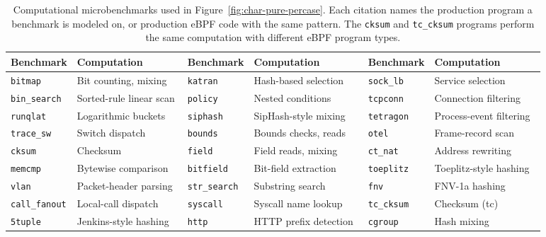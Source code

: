 \begin{table}[t]
\centering
\small
\caption{Computational microbenchmarks used in Figure~\ref{fig:char-pure-percase}. Each citation names the production program a benchmark is modeled on, or production eBPF code with the same pattern. The \texttt{cksum} and \texttt{tc\_cksum} programs perform the same computation with different eBPF program types.}
\label{tab:microbenchmarks}
\renewcommand{\arraystretch}{1.08}
\begin{tabular*}{\textwidth}{@{\extracolsep{\fill}}ll@{\hspace{1em}}ll@{\hspace{1em}}ll@{}}
\toprule
\textbf{Benchmark} & \textbf{Computation} & \textbf{Benchmark} & \textbf{Computation} & \textbf{Benchmark} & \textbf{Computation} \\
\midrule
\texttt{bitmap} & Bit counting, mixing & \texttt{katran} & Hash-based selection~\cite{katran} & \texttt{sock\_lb} & Service selection~\cite{cilium} \\
\texttt{bin\_search} & Sorted-rule linear scan & \texttt{policy} & Nested conditions~\cite{cilium} & \texttt{tcpconn} & Connection filtering~\cite{bcc} \\
\texttt{runqlat} & Logarithmic buckets~\cite{bcc} & \texttt{siphash} & SipHash-style mixing & \texttt{tetragon} & Process-event filtering~\cite{tetragon} \\
\texttt{trace\_sw} & Switch dispatch~\cite{tetragon} & \texttt{bounds} & Bounds checks, reads & \texttt{otel} & Frame-record scan~\cite{otelprofiler} \\
\texttt{cksum} & Checksum~\cite{katran,rfc1071} & \texttt{field} & Field reads, mixing & \texttt{ct\_nat} & Address rewriting~\cite{cilium} \\
\texttt{memcmp} & Bytewise comparison~\cite{pixie_prefix_compare} & \texttt{bitfield} & Bit-field extraction & \texttt{toeplitz} & Toeplitz-style hashing~\cite{qemu_ebpf_rss,microsoft_rss_toeplitz} \\
\texttt{vlan} & Packet-header parsing~\cite{suricata_ebpf} & \texttt{str\_search} & Substring search~\cite{bpftrace} & \texttt{fnv} & FNV-1a hashing~\cite{bpftrace} \\
\texttt{call\_fanout} & Local-call dispatch~\cite{tetragon} & \texttt{syscall} & Syscall name lookup~\cite{tracee} & \texttt{tc\_cksum} & Checksum (tc)~\cite{katran,rfc1071} \\
\texttt{5tuple} & Jenkins-style hashing~\cite{cilium,jenkins2006lookup3} & \texttt{http} & HTTP prefix detection~\cite{tracee} & \texttt{cgroup} & Hash mixing \\
\bottomrule
\end{tabular*}
\end{table}

